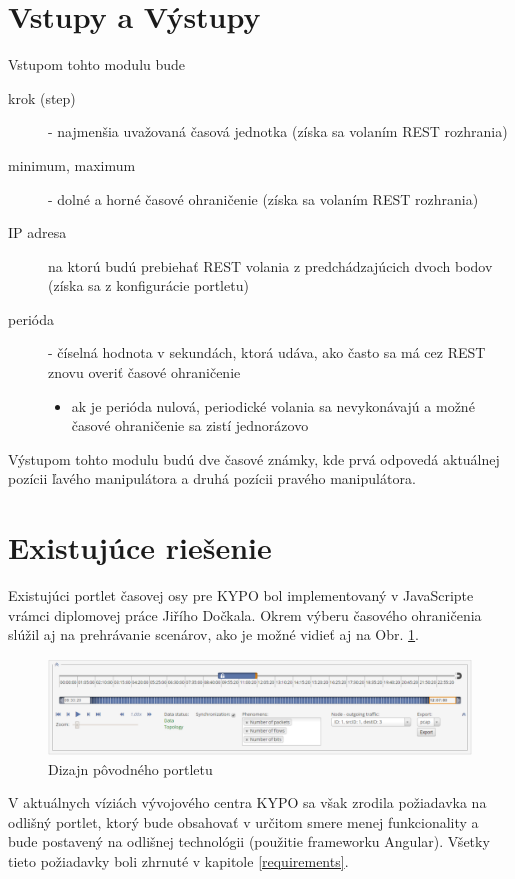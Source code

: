 \documentclass[
  digital, %
  twoside, %
  notable,   %
  nolof,   %
  nolot,   %
]{fithesis3}
\begin{document}
\section{Vstupy a Výstupy}
Vstupom tohto modulu bude
\begin{description}
\item[krok (step)] - najmenšia uvažovaná časová jednotka (získa sa volaním REST rozhrania)
\item[minimum, maximum] - dolné a horné časové ohraničenie (získa sa volaním REST rozhrania)
\item[IP adresa] na ktorú budú prebiehať REST volania z predchádzajúcich dvoch bodov (získa sa z konfigurácie portletu)
\item[perióda] - číselná hodnota v sekundách, ktorá udáva, ako často sa má cez REST znovu overiť časové ohraničenie
\begin{itemize}
\item ak je perióda nulová, periodické volania sa nevykonávajú a možné časové ohraničenie sa zistí jednorázovo
\end{itemize}
\end{description}
Výstupom tohto modulu budú dve časové známky, kde prvá odpovedá aktuálnej pozícii ľavého manipulátora a druhá pozícii pravého manipulátora.

\section{Existujúce riešenie}
Existujúci portlet časovej osy pre KYPO bol implementovaný v JavaScripte vrámci diplomovej práce Jiřího Dočkala\cite{dockal2016webovy}. Okrem výberu časového ohraničenia slúžil aj na prehrávanie scenárov, ako je možné vidieť aj na Obr. \ref{old_portlet}.

\begin{figure}[H]
	\center
	\includegraphics[width=1.0\linewidth]{old_portlet}
	\caption{Dizajn pôvodného portletu\cite{dockal2016webovy}}
	\label{old_portlet}
\end{figure}

V aktuálnych víziách vývojového centra KYPO sa však zrodila požiadavka na odlišný portlet, ktorý bude obsahovať v určitom smere menej funkcionality a bude postavený na odlišnej technológii (použitie frameworku Angular). Všetky tieto požiadavky boli zhrnuté v kapitole \ref{requirements}.
\end{document}
